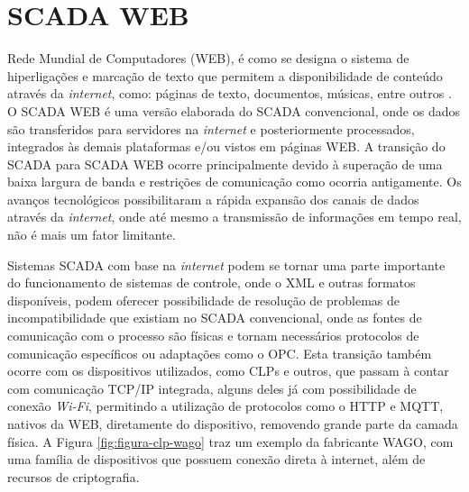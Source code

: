     \begin{figure}[!h]
    \end{figure}
    
\section{SCADA WEB}
\label{sec:scadaweb}

Rede Mundial de Computadores (\gls{WEB}), é como se designa o sistema de hiperligações e marcação de texto que permitem a disponibilidade de conteúdo através da \textit{internet}, como: páginas de texto, documentos, músicas, entre outros \cite{W3C}. O \gls{SCADA} \gls{WEB} é uma versão elaborada do SCADA convencional, onde os dados são transferidos para servidores na \textit{internet} e posteriormente processados, integrados às demais plataformas e/ou vistos em páginas WEB. A transição do SCADA para \gls{SCADA} \gls{WEB} ocorre principalmente devido à superação de uma baixa largura de banda e restrições de comunicação como ocorria antigamente. Os avanços tecnológicos possibilitaram a rápida expansão dos canais de dados através da \textit{internet}, onde até mesmo a transmissão de informações em tempo real, não é mais um fator limitante. \cite{ScadaWebSimp}

Sistemas \gls{SCADA} com base na \textit{internet} podem se tornar uma parte importante do funcionamento de sistemas de controle, onde o \gls{XML} e outras formatos disponíveis, podem oferecer possibilidade de resolução de problemas de incompatibilidade que existiam no \gls{SCADA} convencional, onde as fontes de comunicação com o processo são físicas e tornam necessários protocolos de comunicação específicos ou adaptações como o \gls{OPC}. Esta transição também ocorre com os dispositivos utilizados, como \glspl{CLP} e outros, que passam à contar com comunicação \gls{TCP/IP} integrada, alguns deles já com possibilidade de conexão \textit{Wi-Fi}, permitindo a utilização de protocolos como o \gls{HTTP} e \gls{MQTT}, nativos da \gls{WEB}, diretamente do dispositivo, removendo grande parte da camada física. A Figura \ref{fig:figura-clp-wago} traz um exemplo da fabricante WAGO, com uma família de dispositivos que possuem conexão direta à internet, além de recursos de criptografia.

